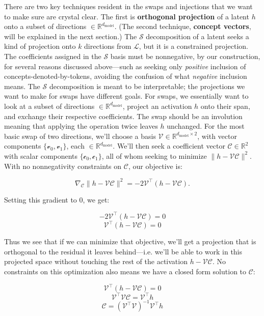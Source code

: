 \documentclass{article}
\newcommand{\jlens}{\mathscr{L}}
\newcommand{\jspace}{\mathscr{S}}
\newcommand{\dmodel}{d_{\text{model}}}
\begin{document}
There are two key techniques resident in the swaps and injections that we want to make sure are crystal clear. The first is \textbf{orthogonal projection} of a latent \(h\) onto a subset of directions \(\in \mathbb{R}^{\dmodel}\). (The second technique, \textbf{concept vectors}, will be explained in the next section.) The \(\jspace\) decomposition of a latent seeks a kind of projection onto \(k\) directions from \(\jlens\), but it is a constrained projection. The coefficients assigned in the \(\jspace\) basis must be nonnegative, by our construction, for several reasons discussed above---such as seeking only \textit{positive} inclusion of concepts-denoted-by-tokens, avoiding the confusion of what \textit{negative} inclusion means. The \(\jspace\) decomposition is meant to be interpretable; the projections we want to make for swaps have different goals. For swaps, we essentially want to look at a subset of directions \(\in \mathbb{R}^{\dmodel}\), project an activation \(h\) onto their span, and exchange their respective coefficients. The swap should be an involution meaning that applying the operation twice leaves \(h\) unchanged. For the most basic swap of two directions, we'll choose a basis \(\mathscr{V} \in \mathbb{R}^{\dmodel \times 2}\), with vector components \(\{\mathscr{v}_0, \mathscr{v}_1\}\), each \(\in \mathbb{R}^{\dmodel}\). We'll then seek a coefficient vector \(\mathscr{C} \in \mathbb{R}^2\) with scalar components \(\{\mathscr{c}_0, \mathscr{c}_1\}\), all of whom seeking to minimize \(\bigl\lVert h - \mathscr{V}\mathscr{C}\bigr\rVert^2\). With no nonnegativity constraints on \(\mathscr{C}\), our objective is:

\[\nabla_{\mathscr{C}}\bigl\lVert h - \mathscr{V}\mathscr{C}\bigr\rVert^2 = -2\mathscr{V}^\top(h - \mathscr{V}\mathscr{C}).\]

Setting this gradient to \(0\), we get:

\[-2\mathscr{V}^\top(h - \mathscr{V}\mathscr{C}) = 0\]
\[\mathscr{V}^\top(h - \mathscr{V}\mathscr{C}) = 0\]

Thus we see that if we can minimize that objective, we'll get a projection that is orthogonal to the residual it leaves behind---i.e. we'll be able to work in this projected space without touching the rest of the activation \(h - \mathscr{V}\mathscr{C}\). No constraints on this optimization also means we have a closed form solution to \(\mathscr{C}\):


\[\mathscr{V}^\top(h - \mathscr{V}\mathscr{C}) = 0\]
\[\mathscr{V}^\top\mathscr{V}\mathscr{C} = \mathscr{V}^\top h\]
\[\mathscr{C} = (\mathscr{V}^\top\mathscr{V})^{-1}\mathscr{V}^\top h\]
\end{document}
